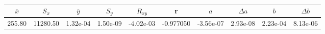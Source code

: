 \begin{tabular}{cccccccccc}
\toprule
$\overline{x}$ & $S_x$ & $\overline{y}$ & $S_y$ & $R_{xy}$ & r & $a$ & $\Delta a$ & $b$ & $\Delta b$ \\
\midrule
255.80 & 11280.50 & 1.32e-04 & 1.50e-09 & -4.02e-03 & -0.977050 & -3.56e-07 & 2.93e-08 & 2.23e-04 & 8.13e-06 \\
\bottomrule
\end{tabular}
